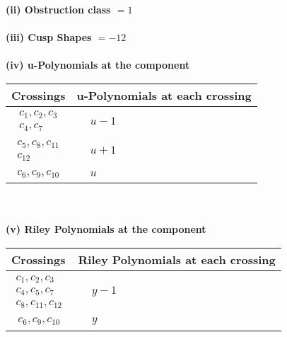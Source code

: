 \documentclass[1p]{elsarticle_modified}
\theoremstyle{definition}
\begin{document}
\flushleft \textbf{(ii) Obstruction class $= 1$}\\~\\
\flushleft \textbf{(iii) Cusp Shapes $= -12$}\\~\\
\newpage\renewcommand{\arraystretch}{1}
\flushleft \textbf{(iv) u-Polynomials at the component}\newline \\
\begin{tabular}{m{50pt}|m{274pt}}
Crossings & \hspace{64pt}u-Polynomials at each crossing \\
\hline $$\begin{aligned}c_{1},c_{2},c_{3}\\c_{4},c_{7}\end{aligned}$$&$\begin{aligned}
&u-1
\end{aligned}$\\
\hline $$\begin{aligned}c_{5},c_{8},c_{11}\\c_{12}\end{aligned}$$&$\begin{aligned}
&u+1
\end{aligned}$\\
\hline $$\begin{aligned}c_{6},c_{9},c_{10}\end{aligned}$$&$\begin{aligned}
&u
\end{aligned}$\\
\hline
\end{tabular}\\~\\
\newpage\renewcommand{\arraystretch}{1}
\flushleft \textbf{(v) Riley Polynomials at the component}\newline \\
\begin{tabular}{m{50pt}|m{274pt}}
Crossings & \hspace{64pt}Riley Polynomials at each crossing \\
\hline $$\begin{aligned}c_{1},c_{2},c_{3}\\c_{4},c_{5},c_{7}\\c_{8},c_{11},c_{12}\end{aligned}$$&$\begin{aligned}
&y-1
\end{aligned}$\\
\hline $$\begin{aligned}c_{6},c_{9},c_{10}\end{aligned}$$&$\begin{aligned}
&y
\end{aligned}$\\
\hline
\end{tabular}\\~\\
\end{document}
